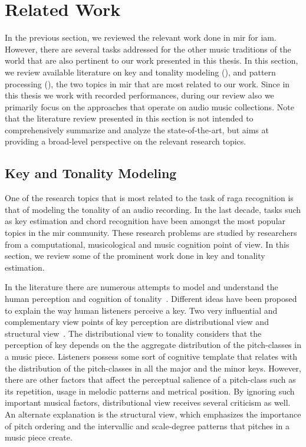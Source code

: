 \section{Related Work}
\label{sec:background_relevant_work_other_music}

In the previous section, we reviewed the relevant work done in \gls{mir} for \gls{iam}. However, there are several tasks addressed for the other music traditions of the world that are also pertinent to our work presented in this thesis. In this section, we review available literature on key and tonality modeling (), and pattern processing (), the two topics in \gls{mir} that are most related to our work. Since in this thesis we work with recorded performances, during our review also we primarily focus on the approaches that operate on audio music collections. Note that the literature review presented in this section is not intended to comprehensively summarize and analyze the state-of-the-art, but aims at providing a broad-level perspective on the relevant research topics.

\subsection{Key and Tonality Modeling}
\label{sec:background_key_and_tonality_modeling}

One of the research topics that is most related to the task of \gls{raga} recognition is that of modeling the tonality of an audio recording. In the last decade, tasks such as key estimation and chord recognition have been amongst the most popular topics in the \gls{mir} community. These research problems are studied by researchers from a computational, musicological and music cognition point of view. In this section, we review some of the prominent work done in key and tonality estimation. 

In the literature there are numerous attempts to model and understand the human perception and cognition of tonality~\citep{longuet1971interpreting,krumhansl1979quantification,chew2000towards,krumhansl2000tonality,cohen1991tonality}. Different ideas have been proposed to explain the way human listeners perceive a key. Two very influential and complementary view points of key perception are distributional view and structural view~\citep{Brown1988,temperley2008pitch}.  The distributional view to tonality considers that the perception of key depends on the the aggregate distribution of the pitch-classes in a music piece. Listeners possess some sort of cognitive template that relates with the distribution of the pitch-classes in all the major and the minor keys. However, there are other factors that affect the perceptual salience of a pitch-class such as its repetition, usage in melodic patterns and metrical position. By ignoring such important musical factors, distributional view receives several criticism as well. An alternate explanation is the structural view, which emphasizes the importance of pitch ordering and the intervallic and scale-degree patterns that pitches in a music piece create.

